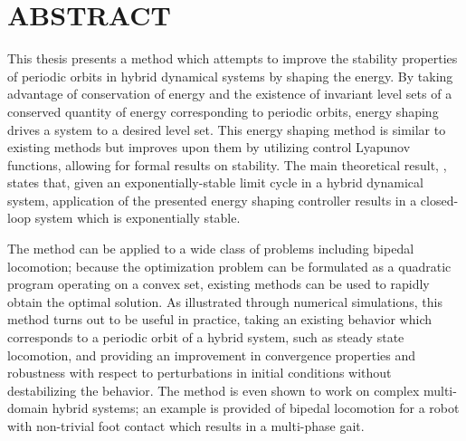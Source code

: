 %
%
%

\chapter*{ABSTRACT}

\pagestyle{plain} %
\setcounter{page}{2}

\indent This thesis presents a method which attempts to improve the stability
properties of periodic orbits in hybrid dynamical systems by shaping the
energy.
%
By taking advantage of conservation of energy and the existence of invariant
level sets of a conserved quantity of energy corresponding to periodic orbits,
energy shaping drives a system to a desired level set.
%
This energy shaping method is similar to existing methods but improves upon them
by utilizing control Lyapunov functions, allowing for formal results on
stability.
%
The main theoretical result, , states that, given
an exponentially-stable limit cycle in a hybrid dynamical system, application of
the presented energy shaping controller results in a closed-loop system which is
exponentially stable.

The method can be applied to a wide class of problems including bipedal
locomotion;
%
because the optimization problem can be formulated as a quadratic program
operating on a convex set, existing methods can be used to rapidly obtain
the optimal solution.
%
As illustrated through numerical simulations, this method turns out to be useful
in practice, taking an existing behavior which corresponds to a periodic orbit
of a hybrid system, such as steady state locomotion, and providing an
improvement in convergence properties and robustness with respect to
perturbations in initial conditions without destabilizing the behavior.
%
The method is even shown to work on complex multi-domain hybrid systems;
%
an example is provided of bipedal locomotion for a robot with non-trivial foot
contact which results in a multi-phase gait.

\pagebreak{}
